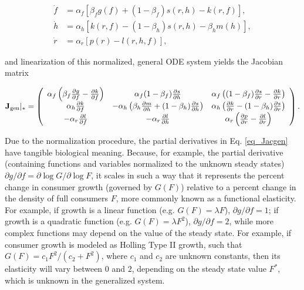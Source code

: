 \documentclass[12pt,english]{article}
\begin{document}
\begin{spacing}{1.9}
 
\begin{align}
\dot{f} &= \alpha_f \left[ \beta_f g(f) + (1-\beta_f)s(r,h) - k(r,f)\right], \nonumber \\
\dot{h} &= \alpha_h \left[ k(r,f) - (1-\beta_h)s(r,h) - \beta_h m(h) \right], \nonumber \\
\dot{r} &= \alpha_r \left[ p(r) - l(r,h,f) \right],
\label{eq_gen}
\end{align}

\noindent and linearization of this normalized, general ODE system yields the Jacobian matrix

\begin{equation}
\mathbf{J}_{\rm gen}|_* =
\left(
\begin{array}{ccc}
 \alpha_f \left(\beta_f \frac{\partial g}{\partial f} - \frac{\partial k}{\partial f} \right) & \alpha_f(1-\beta_f)\frac{\partial s}{\partial h} & \alpha_f \left( (1-\beta_f)\frac{\partial s}{\partial r} - \frac{\partial k}{\partial r} \right) \\
 \alpha_h \frac{\partial k}{\partial f} & -\alpha_h \left(\beta_h \frac{\partial m}{\partial h} + (1-\beta_h) \frac{\partial s}{\partial h} \right) & \alpha_h \left(\frac{\partial k}{\partial r} - (1 - \beta_h)\frac{\partial s}{\partial r} \right) \\
 -\alpha_r \frac{\partial l}{\partial f} & -\alpha_r \frac{\partial l}{\partial h} & \alpha_r \left( \frac{\partial p}{\partial r} - \frac{\partial l}{\partial r} \right) \\
\end{array}
\right).
\label{eq_Jacgen}
\end{equation}

Due to the normalization procedure, the partial derivatives in Eq. \ref{eq_Jacgen} have tangible biological meaning.
Because, for example, the partial derivative (containing functions and variables normalized to the unknown steady states) $\partial g / \partial f = \partial \log G / \partial \log F$, it scales in such a way that it represents the percent change in consumer growth (governed by $G(F)$) relative to a percent change in the density of full consumers $F$, more commonly known as a functional elasticity.
For example, if growth is a linear function (e.g. $G(F) = \lambda F$), $\partial g / \partial f = 1$; if growth is a quadratic function (e.g. $G(F) = \lambda F^2$), $\partial g / \partial f = 2$, while more complex functions may depend on the value of the steady state.
For example, if consumer growth is modeled as Holling Type II growth, such that $G(F) = c_1 F^2/(c_2 + F^2)$, where $c_1$ and $c_2$ are unknown constants, then its elasticity will vary between $0$ and $2$, depending on the steady state value $F^*$, which is unknown in the generalized system.


\end{spacing}
\end{document}
